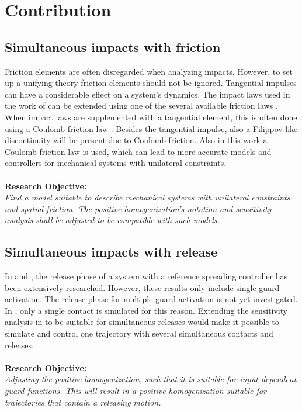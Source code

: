 \documentclass[../DC2017114Bouma.tex]{subfiles}
\begin{document}
\section{Contribution}

\subsection*{Simultaneous impacts with friction}
Friction elements are often disregarded when analyzing impacts. However, to set up a unifying theory friction elements should not be ignored. Tangential impulses can have a considerable effect on a system's dynamics. The impact laws used in the work of \cite{Chen2018a} can be extended using one of the several available friction laws \cite{Leine2008}. When impact laws are supplemented with a tangential element, this is often done using a Coulomb friction law \cite{Glocker2014a}. Besides the tangential impulse, also a Filippov-like discontinuity will be present due to Coulomb friction. Also in this work a Coulomb friction law is used, which can lead to more accurate models and controllers for mechanical systems with unilateral constraints.\\\\
\textbf{Research Objective:}\\
\textit{Find a model suitable to describe mechanical systems with unilateral constraints and spatial friction. The positive homogenization's notation and sensitivity analysis shall be adjusted to be compatible with such models.}

\subsection*{Simultaneous impacts with release}
In \cite{Rijnen2016} and \cite{Rijn2016}, the release phase of a system with a reference spreading controller has been extensively researched. However, these results only include single guard activation. The release phase for multiple guard activation is not yet investigated. In \cite{Chen2018a}, only a single contact is simulated for this reason. Extending the sensitivity analysis in \cite{Chen2018a} to be suitable for simultaneous releases would make it possible to simulate and control one trajectory with several simultaneous contacts and releases.\\\\
\textbf{Research Objective:}\\
\textit{Adjusting the positive homogenization, such that it is suitable for input-dependent guard functions. This will result in a positive homogenization suitable for trajectories that contain a releasing motion.}
\end{document}
